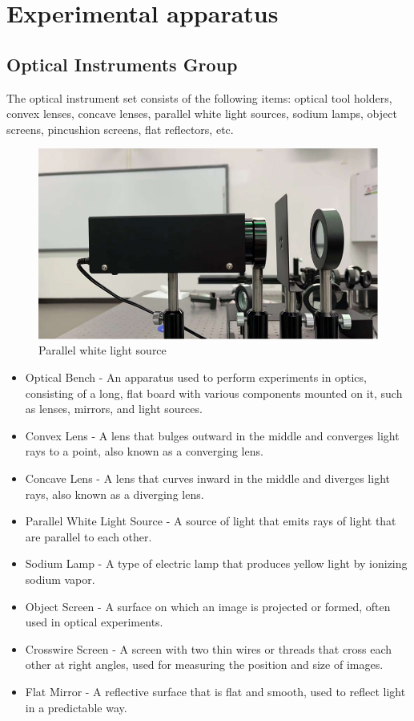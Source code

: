 \documentclass[UTF8]{article}
\begin{document}
	\section{Experimental apparatus}
	
		\subsection{Optical Instruments Group}
		The optical instrument set consists of the following items: optical tool holders, convex lenses, concave lenses, parallel white light sources, sodium lamps, object screens, pincushion screens, flat reflectors, etc.
			\begin{figure}[H]
					\centering
					\includegraphics[clip,scale=0.9,trim={0 50 0 30}]{fig/fig1.png}
					\caption{Parallel white light source}
					\label{figure.1}
				\end{figure}
		\begin{itemize}
		\item Optical Bench - An apparatus used to perform experiments in optics, consisting of a long, flat board with various components mounted on it, such as lenses, mirrors, and light sources.
		\item Convex Lens - A lens that bulges outward in the middle and converges light rays to a point, also known as a converging lens.
		\item Concave Lens - A lens that curves inward in the middle and diverges light rays, also known as a diverging lens.
		\item Parallel White Light Source - A source of light that emits rays of light that are parallel to each other.
		\item Sodium Lamp - A type of electric lamp that produces yellow light by ionizing sodium vapor.
		\item Object Screen - A surface on which an image is projected or formed, often used in optical experiments.
		\item Crosswire Screen - A screen with two thin wires or threads that cross each other at right angles, used for measuring the position and size of images.
		\item Flat Mirror - A reflective surface that is flat and smooth, used to reflect light in a predictable way.
		\end{itemize}
		
\end{document}
